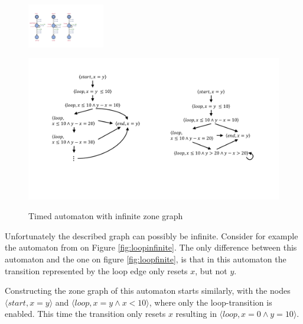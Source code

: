 \begin{figure}
	\centering
	\begin{minipage}[c] {0.5\linewidth}%
		\includegraphics [width=0.3\textwidth]{include/figures/loop_example_original}%
		\label{fig:loopinfinite}
	\end{minipage}%
	\begin{minipage}[c] {0.5\linewidth}%
		\includegraphics [width=\textwidth] {include/figures/loop_original_zonegraph}%
		\label{fig:loopinfinitegraph}
	\end{minipage}
	\caption{Timed automaton with infinite zone graph}
\end{figure} 

Unfortunately the described graph can possibly be infinite. Consider for example the automaton from \cite{bengtsson2004timed} on Figure \ref{fig:loopinfinite}. The only difference between this automaton and the one on figure \ref{fig:loopfinite}, is that in this automaton the transition represented by the loop edge only resets $x$, but not $y$.

\begin{example}
Constructing the zone graph of this automaton starts similarly, with the nodes $\langle start, x=y \rangle$ and $\langle loop, x=y \wedge x<10 \rangle$, where only the loop-transition is enabled. This time the transition only resets $x$ resulting in $\langle loop, x=0 \wedge y=10 \rangle$.


\end{example}
	
